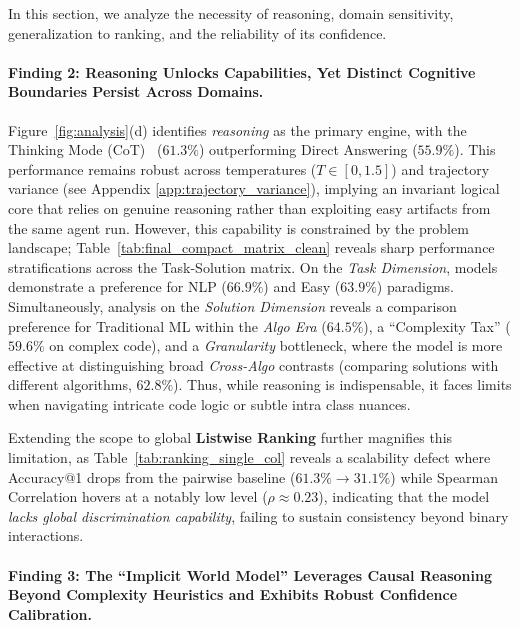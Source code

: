 In this section, we  analyze the necessity of reasoning, domain sensitivity, generalization to ranking, and the reliability of its confidence.

\paragraph{Finding 2: Reasoning Unlocks Capabilities, Yet Distinct Cognitive Boundaries Persist Across Domains.}

Figure~\ref{fig:analysis}(d) identifies \textit{reasoning} as the primary engine, with the Thinking Mode (CoT)~\cite{deepseekai2025deepseekr1incentivizingreasoningcapability, openai2024openaio1card} ($61.3\%$) outperforming Direct Answering ($55.9\%$).
This performance remains robust across temperatures ($T \in [0, 1.5]$) and trajectory variance (see Appendix \ref{app:trajectory_variance}), implying an invariant logical core that relies on genuine reasoning rather than exploiting easy artifacts from the same agent run.
However, this capability is constrained by the problem landscape; Table~\ref{tab:final_compact_matrix_clean} reveals sharp performance stratifications across the Task-Solution matrix.
On the \textit{Task Dimension}, models demonstrate a preference for NLP ($66.9\%$) and Easy ($63.9\%$) paradigms.
Simultaneously, analysis on the \textit{Solution Dimension} reveals a comparison preference for Traditional ML within the \textit{Algo Era} ($64.5\%$), a ``Complexity Tax'' ($59.6\%$ on complex code), and a \textit{Granularity} bottleneck, where the model is more effective at distinguishing broad \textit{Cross-Algo} contrasts (comparing solutions with different algorithms, $62.8\%$).
Thus, while reasoning is indispensable, it faces limits when navigating intricate code logic or subtle intra class nuances.

Extending the scope to global \textbf{Listwise Ranking} further magnifies this limitation, as Table~\ref{tab:ranking_single_col} reveals a scalability defect where Accuracy@1 drops from the pairwise baseline ($61.3\% \to 31.1\%$) while Spearman Correlation hovers at a notably low level ($\rho \approx 0.23$), indicating that the model \textit{lacks global discrimination capability}, failing to sustain consistency beyond binary interactions.


\paragraph{Finding 3: The ``Implicit World Model'' Leverages Causal Reasoning Beyond Complexity Heuristics and Exhibits Robust Confidence Calibration.}

